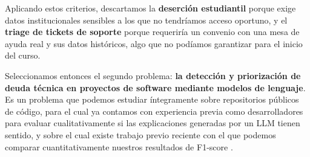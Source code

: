 Aplicando estos criterios, descartamos la \textbf{deserción estudiantil} porque exige datos institucionales sensibles a los que no tendríamos acceso oportuno, y el \textbf{triage de tickets de soporte} porque requeriría un convenio con una mesa de ayuda real y sus datos históricos, algo que no podíamos garantizar para el inicio del curso.

Seleccionamos entonces el segundo problema: \textbf{la detección y priorización de deuda técnica en proyectos de software mediante modelos de lenguaje}. Es un problema que podemos estudiar íntegramente sobre repositorios públicos de código, para el cual ya contamos con experiencia previa como desarrolladores para evaluar cualitativamente si las explicaciones generadas por un LLM tienen sentido, y sobre el cual existe trabajo previo reciente con el que podemos comparar cuantitativamente nuestros resultados de F1-score \parencite{Souza2026}.

\pagebreak
